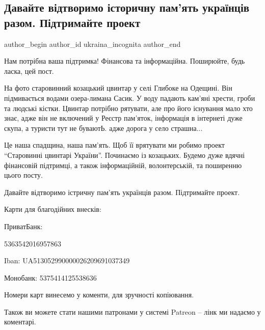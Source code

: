  
 
 
 
 
 
\subsection{Давайте відтворимо історичну пам'ять українців разом. Підтримайте проект}
\label{sec:28_01_2022.fb.ukraina_incognita.1.proekt_istorychna_pamjat}
 
\ifcmt
 author_begin
   author_id ukraina_incognita
 author_end
\fi

Нам потрібна ваша підтримка! Фінансова та інформаційна. Поширюйте, будь ласка,
цей пост.

На фото  старовинний козацький цвинтар у селі Глибоке на Одещині. Він
підмивається водами озера-лимана Сасик. У воду падають кам'яні хрести, гроби та
людські кістки. Цвинтар потрібно рятувати, але про його існування мало хто
знає, адже він не включений у Реєстр пам'яток, інформація в інтернеті дуже
скупа, а туристи тут не буваютЬ. адже дорога у село страшна... 

Це наша спадщина, наша пам'ять. Щоб її врятувати ми робимо проект  \enquote{Старовинні
цвинтарі України}. Починаємо із козацьких. Будемо дуже вдячні фінансовій
підтримці, а також інформаційній, волонтерській, та поширенню цього посту.

Давайте відтворимо істричну пам’ять українців разом. Підтримайте проект.

Карти для благодійних внесків:

ПриватБанк:

5363542016957863

Iban:
UA513052990000026209691037349

Монобанк:
5375414125538636

Номери карт винесемо у коменти, для зручності копіювання.

Також ви можете стати нашими патронами у системі Patreon – лінк ми надаємо у
коментарі.

